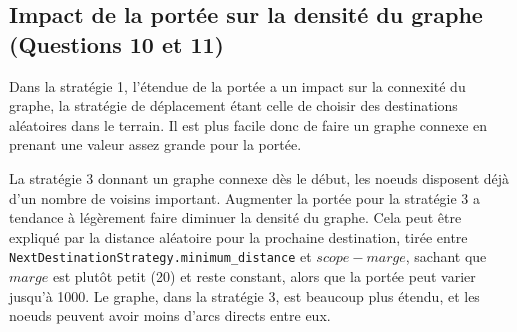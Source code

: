 \documentclass[a4paper]{article}
\begin{document}
\subsection{Impact de la portée sur la densité du graphe (Questions 10 et 11)}

\begin{minipage}{0.40\textwidth}
Dans la stratégie 1, l'étendue de la portée a un impact sur la
connexité du graphe, la stratégie de déplacement étant celle de
choisir des destinations aléatoires dans le terrain. Il est plus
facile donc de faire un graphe connexe en prenant une valeur assez
grande pour la portée.

La stratégie 3 donnant un graphe connexe dès
le début, les noeuds disposent déjà d'un nombre de voisins important.
Augmenter la portée pour la stratégie 3 a tendance à légèrement faire
diminuer la densité du graphe. Cela peut être expliqué par la distance
aléatoire pour la prochaine destination, tirée entre
\texttt{NextDestinationStrategy.minimum\_distance} et $scope - marge$, sachant
que $marge$ est plutôt petit (20) et reste constant, alors que la
portée peut varier jusqu'à 1000. Le graphe, dans la stratégie 3, est beaucoup
plus étendu, et les noeuds peuvent avoir moins d'arcs directs
entre eux.

\end{minipage}%
\hfill
\end{document}
